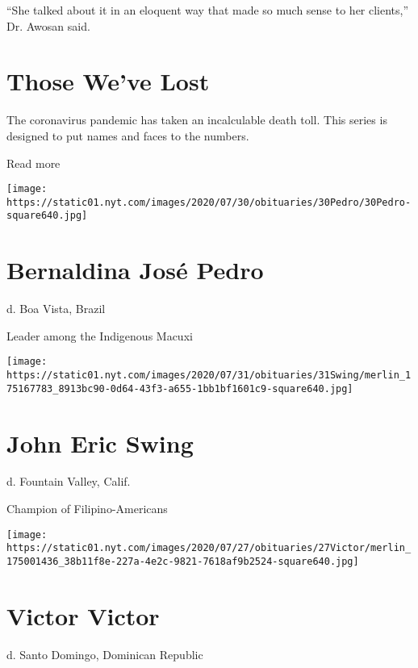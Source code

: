 ``She talked about it in an eloquent way that made so much sense to her
clients,'' Dr. Awosan said.

\href{https://www.nytimes.com/interactive/2020/obituaries/people-died-coronavirus-obituaries.html?action=click\&pgtype=Article\&state=default\&region=BELOW_MAIN_CONTENT\&context=covid_obits_promo}{}

\hypertarget{those-weve-lost}{%
\section{Those We've Lost}\label{those-weve-lost}}

The coronavirus pandemic has taken an incalculable death toll. This
series is designed to put names and faces to the numbers.

Read more

\texttt{[image: https://static01.nyt.com/images/2020/07/30/obituaries/30Pedro/30Pedro-square640.jpg]}

\hypertarget{bernaldina-josuxe9-pedro}{%
\section{Bernaldina José Pedro}\label{bernaldina-josuxe9-pedro}}

d. Boa Vista, Brazil

Leader among the Indigenous Macuxi

\texttt{[image: https://static01.nyt.com/images/2020/07/31/obituaries/31Swing/merlin\_175167783\_8913bc90-0d64-43f3-a655-1bb1bf1601c9-square640.jpg]}

\hypertarget{john-eric-swing}{%
\section{John Eric Swing}\label{john-eric-swing}}

d. Fountain Valley, Calif.

Champion of Filipino-Americans

\texttt{[image: https://static01.nyt.com/images/2020/07/27/obituaries/27Victor/merlin\_175001436\_38b11f8e-227a-4e2c-9821-7618af9b2524-square640.jpg]}

\hypertarget{victor-victor}{%
\section{Victor Victor}\label{victor-victor}}

d. Santo Domingo, Dominican Republic

